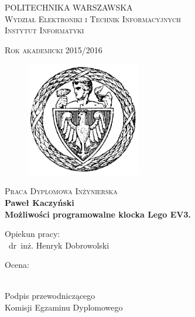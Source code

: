 \begin{titlepage}
\begin{adjustwidth*}{-1.5cm}{-1.5cm}

\begin{minipage}{.7\linewidth}
\centering
\small\textsc{POLITECHNIKA WARSZAWSKA}\\
\small\textsc{Wydział Elektroniki i Technik Informacyjnych}\\
\small\textsc{Instytut Informatyki}
\end{minipage}
\begin{minipage}{.28\linewidth}
\centering
\small\textsc{Rok akademicki 2015/2016}
\end{minipage}

\begin{center}
\vfill
\vfill

\begin{figure}[h]
\centering
\includegraphics[width=5cm]{tytulowa_res/logo_pw.png}
\end{figure}

\textsc{\Large Praca Dyplomowa Inżynierska}\\[1,5cm]

\textbf{Paweł Kaczyński}\\

\huge \textbf{Możliwości programowalne klocka Lego EV3.}\\[2cm]
\vfill

\begin{flushright}
\large{Opiekun pracy:\\
~dr~inż. Henryk Dobrowolski}\\[1cm]
\end{flushright}

\end{center}


\begin{minipage}{.4\linewidth}
{Ocena: \dotfill}
\end{minipage}
\vspace{2cm}

\begin{minipage}{.4\linewidth}
\centering
{\dotfill\\
Podpis przewodniczącego\\ Komisji Egzaminu Dyplomowego}
\end{minipage}


\end{adjustwidth*}
\end{titlepage}
